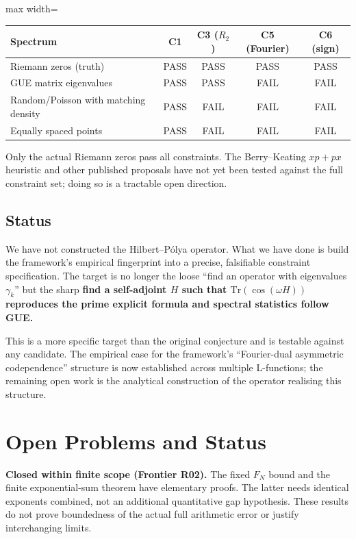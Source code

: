 \documentclass[11pt,a4paper]{article}
\theoremstyle{plain}
\theoremstyle{definition}
\theoremstyle{remark}
\begin{document}
\begin{center}
\begin{adjustbox}{max width=\linewidth}\begin{tabular}{lcccc}
\toprule
Spectrum & C1 & C3 ($R_2$) & C5 (Fourier) & C6 (sign) \\
\midrule
Riemann zeros (truth) & PASS & PASS & PASS & PASS \\
GUE matrix eigenvalues & PASS & PASS & FAIL & FAIL \\
Random/Poisson with matching density & PASS & FAIL & FAIL & FAIL \\
Equally spaced points & PASS & FAIL & FAIL & FAIL \\
\bottomrule
\end{tabular}\end{adjustbox}
\end{center}

Only the actual Riemann zeros pass all constraints. The Berry--Keating
$xp+px$ heuristic and other published proposals have not yet been
tested against the full constraint set; doing so is a tractable open
direction.

\subsection{Status}
\label{sec:hp-status}

We have not constructed the Hilbert--Pólya operator. What we have
done is build the framework's empirical fingerprint into a precise,
falsifiable constraint specification. The target is no longer the
loose ``find an operator with eigenvalues $\gamma_k$'' but the sharp
\textbf{find a self-adjoint $H$ such that $\mathrm{Tr}(\cos(\omega H))$
reproduces the prime explicit formula and spectral statistics follow GUE.}

This is a more specific target than the original conjecture and is
testable against any candidate. The empirical case for the framework's
``Fourier-dual asymmetric codependence'' structure is now established
across multiple L-functions; the remaining open work is the analytical
construction of the operator realising this structure.

\section{Open Problems and Status}
\label{sec:open}
\textbf{Closed within finite scope (Frontier R02).}
The fixed $F_N$ bound and the finite exponential-sum theorem have elementary
proofs. The latter needs identical exponents combined, not an additional
quantitative gap hypothesis. These results do not prove boundedness of
the actual full arithmetic error or justify interchanging limits.
\end{document}

